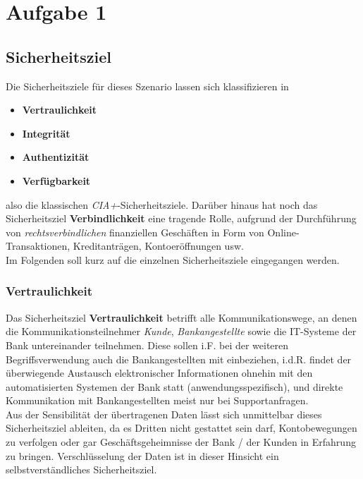 \chapter{Aufgabe 1}

\section{Sicherheitsziel}

Die Sicherheitsziele für dieses Szenario lassen sich klassifizieren in

\begin{itemize}
    \itemsep0.5em
    \item \textbf{Vertraulichkeit}
    \item \textbf{Integrität}
    \item \textbf{Authentizität}
    \item \textbf{Verfügbarkeit}
\end{itemize}

\noindent
also die klassischen \textit{CIA+}-Sicherheitsziele.
Darüber hinaus hat noch das Sicherheitsziel \textbf{Verbindlichkeit} eine tragende Rolle, aufgrund der Durchführung von \textit{rechtsverbindlichen} finanziellen Geschäften in Form von Online-Transaktionen, Kreditanträgen, Kontoeröffnungen usw.\\

\noindent
Im Folgenden soll kurz auf die einzelnen Sicherheitsziele eingegangen werden.

\subsection{Vertraulichkeit}
Das Sicherheitsziel \textbf{Vertraulichkeit} betrifft alle Kommunikationswege, an denen die Kommunikationsteilnehmer \textit{Kunde}, \textit{Bankangestellte} sowie die IT-Systeme der Bank untereinander teilnehmen. Diese sollen i.F. bei der weiteren Begriffsverwendung auch die Bankangestellten mit einbeziehen, i.d.R. findet der überwiegende Austausch elektronischer Informationen ohnehin mit den automatisierten Systemen der Bank statt (anwendungsspezifisch), und direkte Kommunikation mit Bankangestellten meist nur bei Supportanfragen.\\
Aus der Sensibilität der übertragenen Daten lässt sich unmittelbar dieses Sicherheitsziel ableiten, da es Dritten nicht gestattet sein darf, Kontobewegungen zu verfolgen oder gar Geschäftsgeheimnisse der Bank / der Kunden in Erfahrung zu bringen. Verschlüsselung der Daten ist in dieser Hinsicht ein selbstverständliches Sicherheitsziel.

